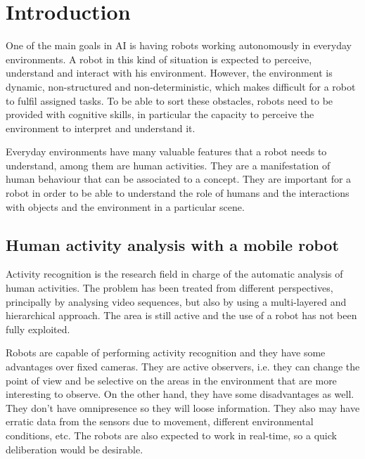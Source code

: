 \chapter{Introduction}

One of the main goals in AI is having robots working autonomously in everyday environments. A robot in this kind of situation is expected to perceive, understand and interact with his environment. However, the environment is dynamic, non-structured and non-deterministic, which makes difficult for a robot to fulfil assigned tasks. To be able to sort these obstacles, robots need to be provided with cognitive skills, in particular the capacity to perceive the environment to interpret and understand it. %

Everyday environments have many valuable features that a robot needs to understand, among them are human activities. They are a manifestation of human behaviour that can be associated to a concept. They are important for a robot in order to be able to understand the role of humans and the interactions with objects and the environment in a particular scene.

\section{Human activity analysis with a mobile robot}
Activity recognition is the research field in charge of the automatic analysis of human activities. The problem has been treated from different perspectives, principally by analysing video sequences, but also by using a multi-layered and hierarchical approach. The area is still active and the use of a robot has not been fully exploited.

Robots are capable of performing activity recognition and they have some advantages over fixed cameras. They are active observers, i.e. they can change the point of view and be selective on the areas in the environment that are more interesting to observe. On the other hand, they have some disadvantages as well. They don't have omnipresence so they will loose information. They also may have erratic data from the sensors due to movement, different environmental conditions, etc. The robots are also expected to work in real-time, so a quick deliberation would be desirable.

